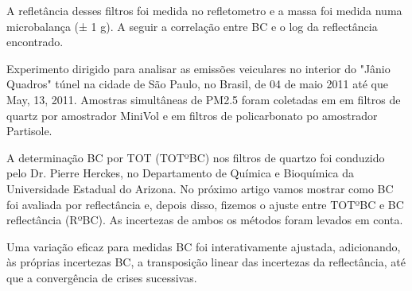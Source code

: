 A refletância desses filtros foi medida no refletometro e a massa foi medida 
numa microbalança (± 1 g).
A seguir a correlação entre BC e o log da reflectância encontrado.

%      

Experimento dirigido para analisar as emissões veiculares no interior do 
"Jânio Quadros" túnel na cidade de São Paulo, no Brasil, de 04 de maio 2011 
até que May, 13, 2011. Amostras simultâneas de PM2.5 foram coletadas em 
em filtros de quartz por amostrador MiniVol e em filtros de policarbonato 
po amostrador Partisole. 


A determinação BC por TOT (TOTºBC) nos filtros de quartzo foi conduzido pelo Dr. Pierre Herckes, no Departamento de Química e Bioquímica da Universidade Estadual do Arizona. No próximo artigo vamos mostrar como BC foi avaliada por reflectância e, depois disso, fizemos o ajuste entre TOTºBC e BC reflectância (RºBC). As incertezas de ambos os métodos foram levados em conta.




Uma variação eficaz para medidas BC foi interativamente ajustada, adicionando, às próprias incertezas BC, a transposição linear das incertezas da reflectância, até que a convergência de crises sucessivas.


